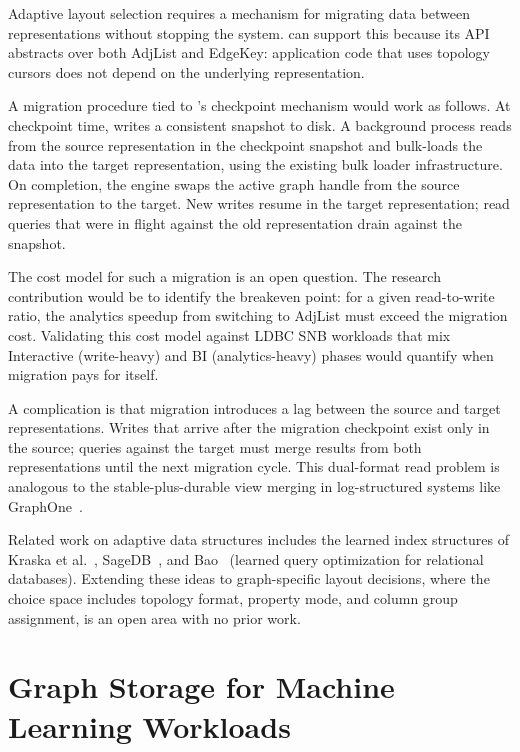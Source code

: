 Adaptive layout selection requires a mechanism for migrating data between representations without stopping the system.
\project{} can support this because its  API abstracts over both AdjList and EdgeKey: application code that uses topology cursors does not depend on the underlying representation.

A migration procedure tied to \wt{}'s checkpoint mechanism would work as follows.
At checkpoint time, \wt{} writes a consistent snapshot to disk.
A background process reads from the source representation in the checkpoint snapshot and bulk-loads the data into the target representation, using the existing bulk loader infrastructure.
On completion, the engine swaps the active graph handle from the source representation to the target.
New writes resume in the target representation; read queries that were in flight against the old representation drain against the snapshot.

The cost model for such a migration is an open question.
The research contribution would be to identify the breakeven point: for a given read-to-write ratio, the analytics speedup from switching to AdjList must exceed the migration cost.
Validating this cost model against LDBC SNB workloads that mix Interactive (write-heavy) and BI (analytics-heavy) phases would quantify when migration pays for itself.

A complication is that migration introduces a lag between the source and target representations.
Writes that arrive after the migration checkpoint exist only in the source; queries against the target must merge results from both representations until the next migration cycle.
This dual-format read problem is analogous to the stable-plus-durable view merging in log-structured systems like GraphOne~\cite{graphone2019kumar}.

Related work on adaptive data structures includes the learned index structures of Kraska et al.~\cite{kraska2018case}, SageDB~\cite{kraska2019SageDB}, and Bao~\cite{marcus2021bao} (learned query optimization for relational databases).
Extending these ideas to graph-specific layout decisions, where the choice space includes topology format, property mode, and column group assignment, is an open area with no prior work.


\section{Graph Storage for Machine Learning Workloads}
\label{sec:future:gnn}

